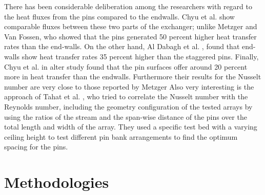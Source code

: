                            There has been considerable deliberation among the researchers with
                           regard to the heat fluxes from the pins compared to the endwalls. Chyu et al.
                           show comparable fluxes between these two parts of the exchanger;
                           unlike Metzger and Van Fossen, who showed that the pins generated 50 percent
                           higher heat transfer rates than the end-walls. On the other hand, Al Dabagh et al.
                           , found that end-walls show heat transfer rates 35 percent higher than
                           the staggered pins. Finally, Chyu et al.  in alter study found that the pin
                           surfaces offer around 20 percent more in heat transfer than the endwalls.
                           Furthermore their results for the Nusselt number are very close to those reported
                           by Metzger 
                           Also very interesting is the approach of Tahat et al. , who tried
                           to correlate the Nusselt number with the Reynolds number, including the
                           geometry configuration of the tested arrays by using the ratios of the stream and
                           the span-wise distance of the pins over the total length and width of the array.
                           They used a specific test bed with a varying ceiling height to test different pin
                           bank arrangements to find the optimum spacing for the pins.






\section{Methodologies}

